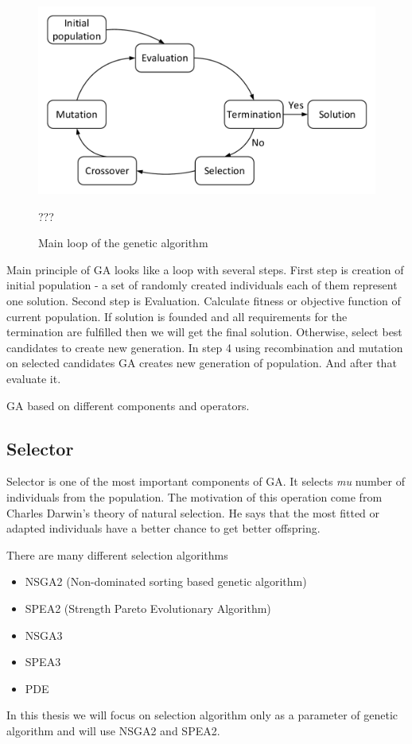 \begin{figure}
	\centering
	\includegraphics{images/GeneticLoop}
	\caption{Main loop of the genetic algorithm}\label{fig:example}???
\end{figure}
Main principle of GA looks like a loop with several steps.
First step is creation of initial population - a set of randomly created individuals each of them represent one solution. 
Second step is Evaluation. Calculate fitness or objective function of current population.
If solution is founded and all requirements for the termination are fulfilled then we will get the final solution. Otherwise, select best candidates to create new generation.
In step 4 using recombination and mutation on selected candidates GA creates new generation of population. And after that evaluate it.

GA based on different components and operators.
\subsection{Selector}
Selector is one of the most important components of GA. It selects \textit{mu} number of individuals from the population. The motivation of this operation come from Charles Darwin's theory of natural selection. He says that the most fitted or adapted individuals have a better chance to get better offspring.

There are many different selection algorithms
\begin{itemize}
	\item NSGA2 (Non-dominated sorting based genetic algorithm)
	\item SPEA2 (Strength Pareto Evolutionary Algorithm)
	\item NSGA3
	\item SPEA3
	\item PDE 
\end{itemize}
In this thesis we will focus on selection algorithm only as a parameter of genetic algorithm and will use NSGA2 and SPEA2. 
